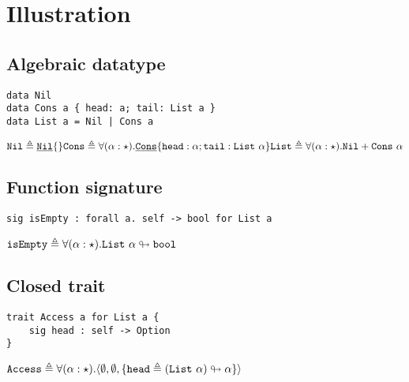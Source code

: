 \documentclass{article}[11pt]
\newcommand{\term}[1]{\verb~#1~}
\newcommand{\cons}[1]{\underline{\verb~#1~}}
\begin{document}
    \section{Illustration}\label{sec:illustration}

    \subsection{Algebraic datatype}\label{subsec:algebraic-datatype}

    \begin{verbatim}
data Nil
data Cons a { head: a; tail: List a }
data List a = Nil | Cons a
    \end{verbatim}

    \noindent\begin{math}
                 \term{Nil} \triangleq \cons{Nil}\{\} \\
                 \term{Cons} \triangleq \forall(\alpha:\star).\cons{Cons}\{ \term{head} :\alpha; \term{tail} : \term{List}~\alpha \} \\
                 \term{List} \triangleq \forall(\alpha:\star).\term{Nil} + \term{Cons}~\alpha
    \end{math}

    \subsection{Function signature}\label{subsec:function-signature}

    \begin{verbatim}
sig isEmpty : forall a. self -> bool for List a
    \end{verbatim}

    \noindent\begin{math}
                 \term{isEmpty} \triangleq \forall(\alpha:\star).\term{List}~\alpha \looparrowright \term{bool}
    \end{math}

    \subsection{Closed trait}\label{subsec:closed-trait}

    \begin{verbatim}
trait Access a for List a {
    sig head : self -> Option
}
    \end{verbatim}

    \noindent\begin{math}
                 \term{Access} \triangleq \forall(\alpha:\star).\langle
                 \emptyset,
                 \emptyset,
                 \{ \term{head} \triangleq (\term{List}~\alpha) \looparrowright \alpha \} \rangle
    \end{math}
\end{document}
